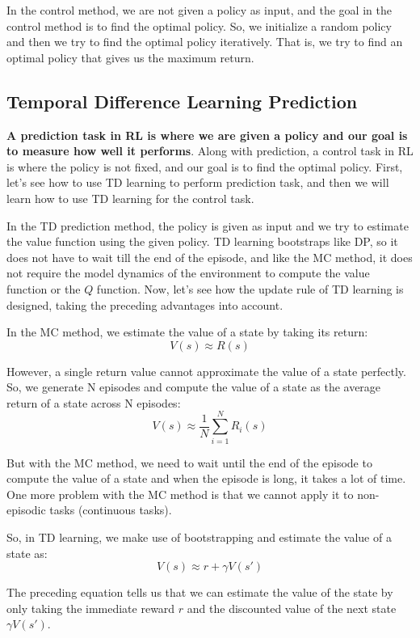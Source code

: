 In the control method, we are not given a policy as input, and the goal in 
the control method is to find the optimal policy. So, we initialize a 
random policy and then we try to find the optimal policy iteratively. That 
is, we try to find an optimal policy that gives us the maximum return.  

\subsection{Temporal Difference Learning Prediction}

{\bf A prediction task in RL is where we are given a policy and our goal is 
to measure how well it performs}. Along with prediction, a control task in 
RL is where the policy is not fixed, and our goal is to find the optimal 
policy. First, let's see how to use TD learning to perform prediction task, 
and then we will learn how to use TD learning for the control task. 

In the TD prediction method, the policy is given as input and we try to 
estimate the value function using the given policy. TD learning bootstraps 
like DP, so it does not have to wait till the end of the episode, and like 
the MC method, it does not require the model dynamics of the environment 
to compute the value function or the $Q$ function. Now, let's see how the 
update rule of TD learning is designed, taking the preceding advantages 
into account.

In the MC method, we estimate the value of a state by taking its return:  
$$
V(s) \approx R(s)
$$

However, a single return value cannot approximate the value of a state 
perfectly. So, we generate N episodes and compute the value of a state 
as the average return of a state across N episodes:
$$
V(s) \approx \frac{1}{N} \sum_{i=1}^{N} R_i(s)
$$

But with the MC method, we need to wait until the end of the episode to 
compute the value of a state and when the episode is long, it takes a 
lot of time. One more problem with the MC method is that we cannot apply 
it to non-episodic tasks (continuous tasks).  

So, in TD learning, we make use of bootstrapping and estimate the value 
of a state as:
\begin{equation}\label{bootstrapping_TD}
V(s) \approx r + \gamma V(s')
\end{equation}

The preceding equation tells us that we can estimate the value of the 
state by only taking the immediate reward $r$ and the discounted value 
of the next state $\gamma V(s')$.

